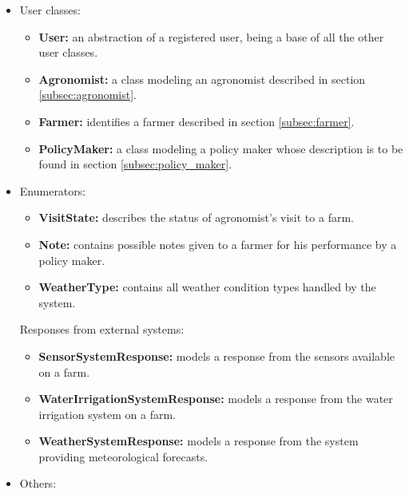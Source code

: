 \begin{itemize}
    \item User classes:
    
    \begin{itemize}
        \item \textbf{User:} an abstraction of a registered user, being a base of all the other user classes.
        \item \textbf{Agronomist:} a class modeling an agronomist described in section \ref{subsec:agronomist}.
        \item \textbf{Farmer:} identifies a farmer described in section \ref{subsec:farmer}.
        \item \textbf{PolicyMaker:} a class modeling a policy maker whose description is to be found in section \ref{subsec:policy_maker}.
    \end{itemize}
    
    \item Enumerators:
    
    \begin{itemize}
        \item \textbf{VisitState:} describes the status of agronomist's visit to a farm.
        \item \textbf{Note:} contains possible notes given to a farmer for his performance by a policy maker.
        \item \textbf{WeatherType:} contains all weather condition types handled by the system.
    \end{itemize}
    
    Responses from external systems:
    
    \begin{itemize}
        \item \textbf{SensorSystemResponse:} models a response from the sensors available on a farm.
        \item \textbf{WaterIrrigationSystemResponse:} models a response from the water irrigation system on a farm.
        \item \textbf{WeatherSystemResponse:} models a response from the system providing meteorological forecasts.
    \end{itemize}
    
    \item Others:
    

\end{itemize}
